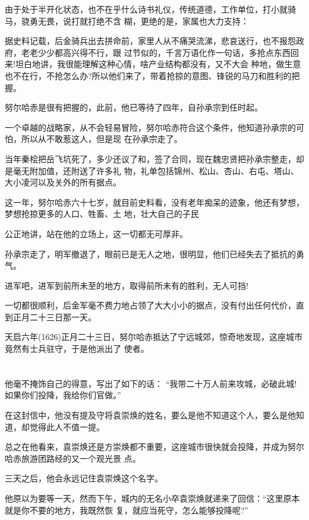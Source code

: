 \documentclass[11pt,a4paper,onecolumn]{article}
\begin{document}
由于处于半开化状态，也不在乎什么诗书礼仪，传统道德，工作单位，打小就骑马，骁勇无畏，说打就打绝不含
糊，更绝的是，家属也大力支持：

据史料记载，后金骑兵出去拼命前，家里人从不痛哭流涕，悲哀送行，也不报怨政府，老老少少都高兴得不行，跟
过节似的，千言万语化作一句话，多抢点东西回来!坦白地讲，我很能理解这种心情，啥产业结构都没有，又不大会
种地，做生意也不在行，不抢怎么办?所以他们来了，带着抢掠的意图、锋锐的马刀和胜利的把握。

努尔哈赤是很有把握的，此前，他已等待了四年，自孙承宗到任时起。

一个卓越的战略家，从不会轻易冒险，努尔哈赤符合这个条件，他知道孙承宗的可怕，所以从不敢惹这人，但是现
在孙承宗走了。

当年秦桧把岳飞坑死了，多少还议了和，签了合同，现在魏忠贤把孙承宗整走，却是毫无附加值，还附送了许多礼
物，礼单包括锦州、松山、杏山、右屯、塔山、大小凌河以及关外的所有据点。

这一年，努尔哈赤六十七岁，就目前史料看，没有老年痴呆的迹象，他还有梦想，梦想抢掠更多的人口、牲畜、土
地，壮大自己的子民

公正地讲，站在他的立场上，这一切都无可厚非。

孙承宗走了，明军撤退了，眼前已是无人之地，很明显，他们已经失去了抵抗的勇气。

进军吧，进军到前所未至的地方，取得前所未有的胜利，无人可挡!

一切都很顺利，后金军毫不费力地占领了大大小小的据点，没有付出任何代价，直到正月二十三日那一天。

天启六年(1626)正月二十三日，努尔哈赤抵达了宁远城郊，惊奇地发现，这座城市竟然有士兵驻守，于是他派出了
使者。

\section[\thesection]{}

他毫不掩饰自己的得意，写出了如下的话： ``我带二十万人前来攻城，必破此城!如果你们投降，我给你们官做。''

在这封信中，他没有提及守将袁崇焕的姓名，要么是他不知道这个人，要么是他知道，却觉得此人不值一提。

总之在他看来，袁崇焕还是方崇焕都不重要，这座城市很快就会投降，并成为努尔哈赤旅游团路经的又一个观光景
点。

三天之后，他会永远记住袁崇焕这个名字。

他原以为要等一天，然而下午，城内的无名小卒袁崇焕就递来了回信：``这里原本就是你不要的地方，我既然恢
复，就应当死守，怎么能够投降呢?''
\end{document}
